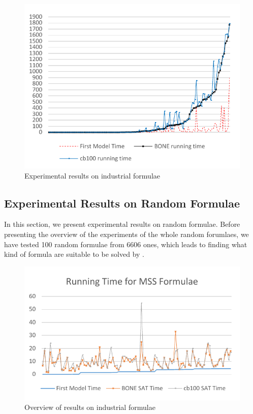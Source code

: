 \begin{figure}
    \centering
    \includegraphics[scale=0.8]{ind2.pdf}
   \caption{Experimental results on industrial formulae}
   \label{fig:ind-time}
\end{figure}

\subsection{Experimental Results on Random Formulae}
In this section, we present experimental results on random formulae. Before presenting the overview of the experiments of the whole random forumlaes, we  have tested 100 random formulae from 6606 ones, which leads to finding what kind of formula are suitable to be solved by \tool.

\begin{figure}
    \centering
    \includegraphics[scale=0.7]{mcs.pdf}
   \caption{Overview of results on industrial formulae}
   \label{fig:mcs-time}
\end{figure}


